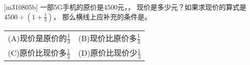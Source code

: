 [m310805b]\quad
一部5G手机的原价是4500元，\underline{\hspace{1.5cm}}，
现价是多少元？如果求现价的算式是$4500\div (1+\frac{1}{3})$，
那么横线上应补充的条件是。
\par
\hspace{7em}
\begin{tabular}{ll}
    (A)\quad 现价是原价的$\frac{1}{3}$ &
    (B)\quad 现价比原价多$\frac{1}{3}$ \\
    (C)\quad 原价比现价多$\frac{1}{3}$ &
    (D)\quad 原价比现价少$\frac{1}{3}$
\end{tabular}
\par